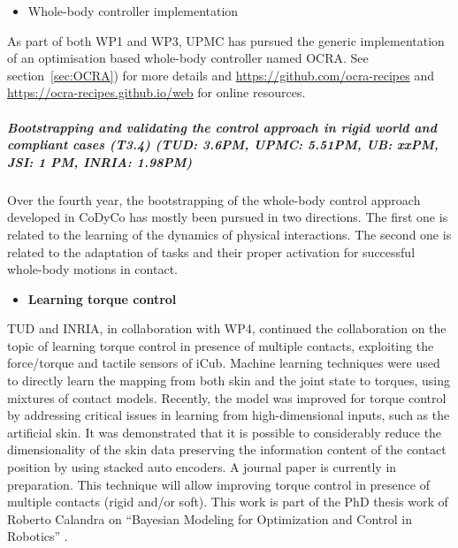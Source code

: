 \begin{itemize}
\item {Whole-body controller implementation}
\end{itemize}
As part of both WP1 and WP3, UPMC has pursued the generic implementation of an optimisation based whole-body controller named OCRA. See section~\ref{sec:OCRA}) for more details and \url{https://github.com/ocra-recipes} and \url{https://ocra-recipes.github.io/web} for online resources.

\subparagraph{Bootstrapping and validating the control approach in rigid world and compliant cases (T3.4) (TUD: 3.6PM, UPMC: 5.51PM, UB: xxPM, JSI: 1 PM, INRIA: 1.98PM)}

Over the fourth year, the bootstrapping of the whole-body control approach developed in CoDyCo has mostly been pursued in two directions. The first one is related to the learning of the dynamics of physical interactions. The second one is related to the adaptation of tasks and their proper activation for successful whole-body motions in contact.

\begin{itemize}
\item \textbf{Learning torque control}
\end{itemize}
TUD and INRIA, in collaboration with WP4, continued the collaboration on the topic of learning torque control in presence of multiple contacts, exploiting the force/torque and tactile sensors of iCub. Machine learning techniques were used to directly learn the mapping from both skin and the joint state to torques, using mixtures of contact models. Recently, the model was improved for torque control by addressing critical issues in learning from high-dimensional inputs, such as the artificial skin. It was demonstrated that it is possible to considerably reduce the dimensionality of the skin data preserving the information content of the contact position by using stacked auto encoders. A journal paper is currently in preparation. This technique will allow improving torque control in presence of multiple contacts (rigid and/or soft). This work is part of the PhD thesis work of Roberto Calandra on ``Bayesian Modeling for Optimization and Control in Robotics'' \cite{calandra2016PhD}.\\


